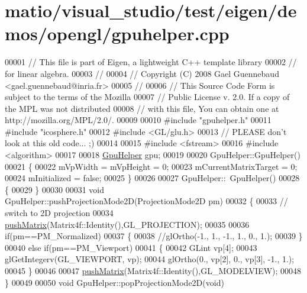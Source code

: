 \hypertarget{matio_2visual__studio_2test_2eigen_2demos_2opengl_2gpuhelper_8cpp_source}{}\section{matio/visual\+\_\+studio/test/eigen/demos/opengl/gpuhelper.cpp}
\label{matio_2visual__studio_2test_2eigen_2demos_2opengl_2gpuhelper_8cpp_source}

\begin{DoxyCode}
00001 \textcolor{comment}{// This file is part of Eigen, a lightweight C++ template library}
00002 \textcolor{comment}{// for linear algebra.}
00003 \textcolor{comment}{//}
00004 \textcolor{comment}{// Copyright (C) 2008 Gael Guennebaud <gael.guennebaud@inria.fr>}
00005 \textcolor{comment}{//}
00006 \textcolor{comment}{// This Source Code Form is subject to the terms of the Mozilla}
00007 \textcolor{comment}{// Public License v. 2.0. If a copy of the MPL was not distributed}
00008 \textcolor{comment}{// with this file, You can obtain one at http://mozilla.org/MPL/2.0/.}
00009 
00010 \textcolor{preprocessor}{#include "gpuhelper.h"}
00011 \textcolor{preprocessor}{#include "icosphere.h"}
00012 \textcolor{preprocessor}{#include <GL/glu.h>}
00013 \textcolor{comment}{// PLEASE don't look at this old code... ;)}
00014 
00015 \textcolor{preprocessor}{#include <fstream>}
00016 \textcolor{preprocessor}{#include <algorithm>}
00017 
00018 \hyperlink{class_gpu_helper}{GpuHelper} gpu;
00019 
00020 GpuHelper::GpuHelper()
00021 \{
00022     mVpWidth = mVpHeight = 0;
00023     mCurrentMatrixTarget = 0;
00024     mInitialized = \textcolor{keyword}{false};
00025 \}
00026 
00027 GpuHelper::~GpuHelper()
00028 \{
00029 \}
00030 
00031 \textcolor{keywordtype}{void} GpuHelper::pushProjectionMode2D(ProjectionMode2D pm)
00032 \{
00033     \textcolor{comment}{// switch to 2D projection}
00034     \hyperlink{class_gpu_helper_ac51c8b669a80ca6e4338c87136fb991e}{pushMatrix}(Matrix4f::Identity(),GL\_PROJECTION);
00035 
00036     \textcolor{keywordflow}{if}(pm==PM\_Normalized)
00037     \{
00038         \textcolor{comment}{//glOrtho(-1., 1., -1., 1., 0., 1.);}
00039     \}
00040     \textcolor{keywordflow}{else} \textcolor{keywordflow}{if}(pm==PM\_Viewport)
00041     \{
00042         GLint vp[4];
00043         glGetIntegerv(GL\_VIEWPORT, vp);
00044         glOrtho(0., vp[2], 0., vp[3], -1., 1.);
00045     \}
00046 
00047     \hyperlink{class_gpu_helper_ac51c8b669a80ca6e4338c87136fb991e}{pushMatrix}(Matrix4f::Identity(),GL\_MODELVIEW);
00048 \}
00049 
00050 \textcolor{keywordtype}{void} GpuHelper::popProjectionMode2D(\textcolor{keywordtype}{void})

\end{DoxyCode}
